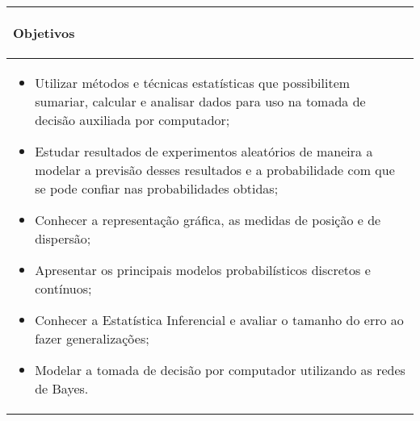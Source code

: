 \hspace{1cm}
\begin{table}[h]
\centering
\begin{small} 
\setlength{\tabcolsep}{3pt} 
\begin{tabular}{|p{15cm}|}\hline

\begin{center}\textbf{Objetivos}\end{center}\\ \hline
\begin{itemize}

\item Utilizar métodos e técnicas estatísticas que possibilitem sumariar, calcular e analisar dados para uso na tomada de decisão auxiliada por computador;
\item Estudar resultados de experimentos aleatórios de maneira a modelar a previsão desses resultados e a probabilidade com que se pode confiar nas probabilidades obtidas;
\item Conhecer a representação gráfica, as medidas de posição e de dispersão;
\item Apresentar os principais modelos probabilísticos discretos e contínuos;
\item Conhecer a Estatística Inferencial e avaliar o tamanho do erro ao fazer generalizações;
\item Modelar a tomada de decisão por computador utilizando as redes de Bayes.
\end{itemize}
\\ \hline

\end{tabular} 
\end{small}
\end{table}

